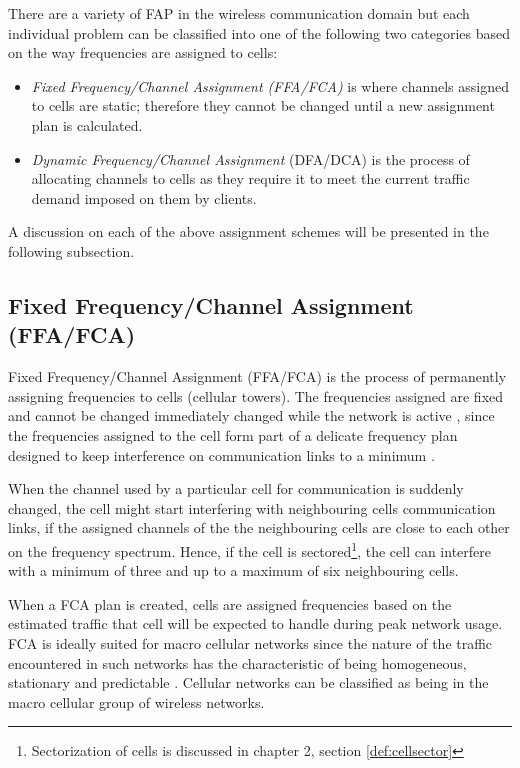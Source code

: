 There are a variety of FAP in the wireless communication domain but each individual problem can be classified into one of the following two categories based on the way frequencies are assigned to cells:
\begin{itemize}
\item \emph{Fixed Frequency/Channel Assignment (FFA/FCA)} is where channels assigned to cells are static; therefore they cannot be changed until a new assignment plan is calculated.
\item \emph{Dynamic Frequency/Channel Assignment} (DFA/DCA) is the process of allocating channels to cells as they require it to meet the current traffic demand imposed on them by clients. 
\end{itemize}

A discussion on each of the above assignment schemes will be presented in the following subsection.
\subsection{Fixed Frequency/Channel Assignment (FFA/FCA)}
Fixed Frequency/Channel Assignment (FFA/FCA) is the process of permanently assigning frequencies to cells (cellular towers). The frequencies assigned are fixed and cannot be changed immediately changed while the network is active , since the frequencies assigned to the cell form part of a delicate frequency plan designed to keep interference on communication links to a minimum \cite{PrinciplesMobileCommunication}. 

When the channel used by a particular cell for communication is suddenly changed, the cell might start interfering with neighbouring cells communication links, if the assigned channels of the the neighbouring cells are close to each other on the frequency spectrum. Hence, if the cell is sectored\footnote{Sectorization of cells is discussed in chapter 2, section \ref{def:cellsector}}, the cell can interfere with a minimum of three and up to a maximum of six neighbouring cells\cite{PrinciplesMobileCommunication}.

When a FCA plan is created, cells are assigned frequencies based on the estimated traffic that cell will be expected to handle during peak network usage. FCA is ideally suited for macro cellular networks since the nature of the traffic encountered in such networks has the characteristic of being homogeneous, stationary and predictable \cite{PrinciplesMobileCommunication}. Cellular networks can be classified as being in the macro cellular group of wireless networks.

